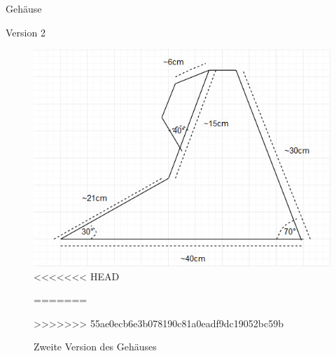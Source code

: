 \documentclass[mathserif,9pt]{article}
\begin{document}
    \begin{frame}{Gehäuse}
        \begin{block}{Version 2}
            \begin{figure}
                \centering
                \includegraphics[height=0.5\paperheight]{img/gehause-version2.jpeg}
<<<<<<< HEAD
                \caption[M9]{(M9) Zweite Version des Geh\"auses}
=======
                \caption{Zweite Version des Geh\"auses}
>>>>>>> 55ae0ecb6e3b078190c81a0eadf9dc19052bc59b
                \label{fig:gehausev2}
            \end{figure}
        \end{block}
    \end{frame}
\end{document}
